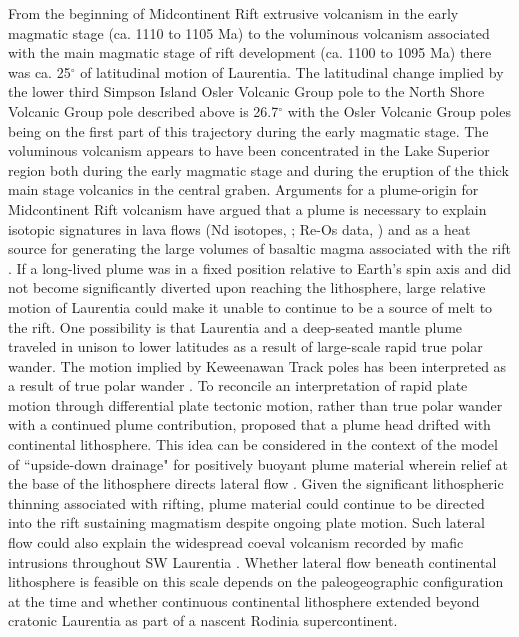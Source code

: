 \documentclass[draft,gc]{AGUTeX}
\begin{document}
\begin{article}
From the beginning of Midcontinent Rift extrusive volcanism in the early magmatic stage (ca. 1110 to 1105 Ma) to the voluminous volcanism associated with the main magmatic stage of rift development (ca. 1100 to 1095 Ma) there was ca. 25$^\circ$ of latitudinal motion of Laurentia. The latitudinal change implied by the lower third Simpson Island Osler Volcanic Group pole to the North Shore Volcanic Group pole described above is 26.7$^\circ$ with the Osler Volcanic Group poles being on the first part of this trajectory during the early magmatic stage. The voluminous volcanism appears to have been concentrated in the Lake Superior region both during the early magmatic stage and during the eruption of the thick main stage volcanics in the central graben. Arguments for a plume-origin for Midcontinent Rift volcanism have argued that a plume is necessary to explain isotopic signatures in lava flows (Nd isotopes, \citet{Nicholson1997a}; Re-Os data, \citet{Shirey1997a}) and as a heat source for generating the large volumes of basaltic magma associated with the rift \citep{Cannon1992b}. If a long-lived plume was in a fixed position relative to Earth's spin axis and did not become significantly diverted upon reaching the lithosphere, large relative motion of Laurentia could make it unable to continue to be a source of melt to the rift. One possibility is that Laurentia and a deep-seated mantle plume traveled in unison to lower latitudes as a result of large-scale rapid true polar wander. The motion implied by Keweenawan Track poles has been interpreted as a result of true polar wander \citep{Evans2003b, Mitchell2012a}. To reconcile an interpretation of rapid plate motion through differential plate tectonic motion, rather than true polar wander with a continued plume contribution, \citet{Davis1997a} proposed that a plume head drifted with continental lithosphere. This idea can be considered in the context of the model of ``upside-down drainage" for positively buoyant plume material wherein relief at the base of the lithosphere directs lateral flow \citep{Sleep1997a, Ebinger1998a}. Given the significant lithospheric thinning associated with rifting, plume material could continue to be directed into the rift sustaining magmatism despite ongoing plate motion. Such lateral flow could also explain the widespread coeval volcanism recorded by mafic intrusions throughout SW Laurentia \citep{Heaman1992c,Weil2003a}. Whether lateral flow beneath continental lithosphere is feasible on this scale depends on the paleogeographic configuration at the time and whether continuous continental lithosphere extended beyond cratonic Laurentia as part of a nascent Rodinia supercontinent.


\end{article}
\end{document}
